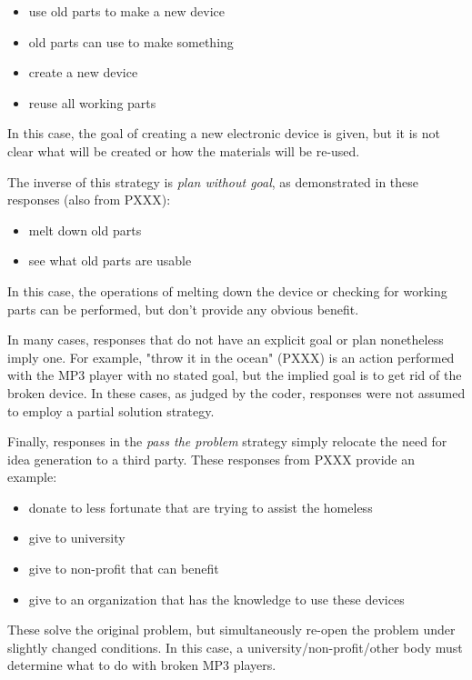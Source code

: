 \begin{itemize}
    \item use old parts to make a new device
    \item old parts can use to make something
    \item create a new device
    \item reuse all working parts
\end{itemize}

In this case, the goal of creating a new electronic device is given, but it is not clear what will be created or how the materials will be re-used.

The inverse of this strategy is \emph{plan without goal}, as demonstrated in these responses (also from PXXX):

\begin{itemize}
    \item melt down old parts
    \item see what old parts are usable
\end{itemize}

In this case, the operations of melting down the device or checking for working parts can be performed, but don't provide any obvious benefit.

In many cases, responses that do not have an explicit goal or plan nonetheless imply one. For example, "throw it in the ocean" (PXXX) is an action performed with the MP3 player with no stated goal, but the implied goal is to get rid of the broken device. In these cases, as judged by the coder, responses were not assumed to employ a partial solution strategy.

Finally, responses in the \emph{pass the problem} strategy simply relocate the need for idea generation to a third party. These responses from PXXX provide an example:

\begin{itemize}
    \item donate to less fortunate that are trying to assist the homeless
    \item give to university
    \item give to non-profit that can benefit
    \item give to an organization that has the knowledge to use these devices
\end{itemize}

These solve the original problem, but simultaneously re-open the problem under slightly changed conditions. In this case, a university/non-profit/other body must determine what to do with broken MP3 players.

